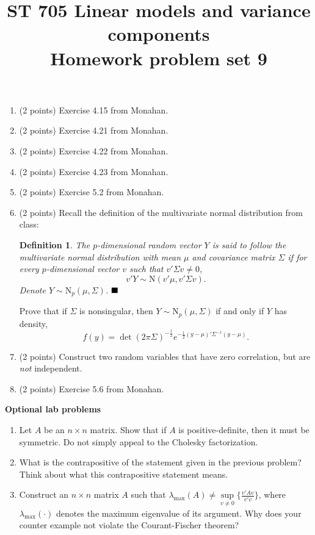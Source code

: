 \documentclass[11pt]{article}
\title{ST 705 Linear models and variance components \\ 
        Homework problem set 9}
\newtheorem{definition}[theorem]{Definition}
\begin{document}
\maketitle

\begin{enumerate}

\item(2 points) Exercise 4.15 from Monahan.

\item(2 points) Exercise 4.21 from Monahan.

\item(2 points) Exercise 4.22 from Monahan.

\item(2 points) Exercise 4.23 from Monahan.

\item(2 points) Exercise 5.2 from Monahan.

\item(2 points) Recall the definition of the multivariate normal distribution from class:

\begin{definition}
The $p$-dimensional random vector $Y$ is said to follow the multivariate normal distribution with mean $\mu$ and covariance matrix $\Sigma$ if for every $p$-dimensional vector $v$ such that $v'\Sigma v \ne 0$,
\[
v'Y \sim \text{N}(v'\mu,v'\Sigma v).
\]
Denote $Y \sim \text{N}_{p}(\mu,\Sigma)$. $\hfill \blacksquare$
\end{definition}
Prove that if $\Sigma$ is nonsingular, then $Y \sim \text{N}_{p}(\mu,\Sigma)$ if and only if $Y$ has density,
\[
f(y) = \det(2\pi\Sigma)^{-\frac{1}{2}}e^{-\frac{1}{2}(y-\mu)'\Sigma^{-1}(y-\mu)}.
\]

\item(2 points) Construct two random variables that have zero correlation, but are {\em not} independent.

\item(2 points) Exercise 5.6 from Monahan.
\end{enumerate}

{\noindent\bf Optional lab problems}

\begin{enumerate}

\item Let $A$ be an $n\times n$ matrix.  Show that if $A$ is positive-definite, then it must be symmetric.  Do not simply appeal to the Cholesky factorization.

\item What is the contrapositive of the statement given in the previous problem?  Think about what this contrapositive statement means.

\item Construct an $n\times n$ matrix $A$ such that $\lambda_{\max}(A) \ne \sup\limits_{v\ne0}\big\{\frac{v'Av}{v'v}\big\}$, where $\lambda_{\max}(\cdot)$ denotes the maximum eigenvalue of its argument.  Why does your counter example not violate the Courant-Fischer theorem?

\end{enumerate}
\end{document}
